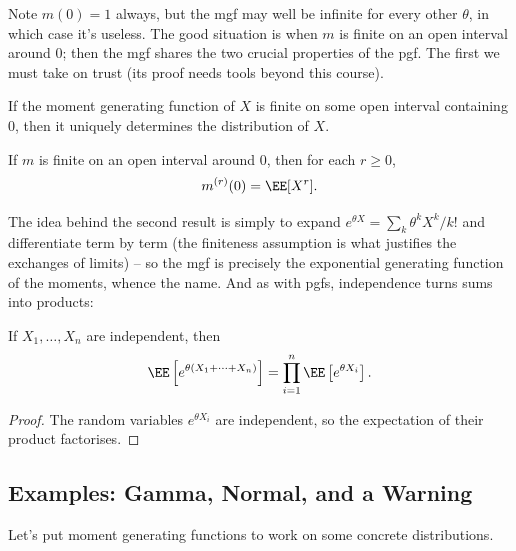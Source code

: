 Note $m(0) = 1$ always, but the mgf may well be infinite for every other $\theta$, in which case it's useless. The good situation is when $m$ is finite on an open interval around $0$; then the mgf shares the two crucial properties of the pgf. The first we must take on trust (its proof needs tools beyond this course).

\begin{theorem}[Uniqueness]
	If the moment generating function of $X$ is finite on some open interval containing $0$, then it uniquely determines the distribution of $X$.
\end{theorem}

\begin{theorem}
	If $m$ is finite on an open interval around $0$, then for each $r \geq 0$,
	$$
	m^{(r)}(0) = \EE[X^r].
	$$
\end{theorem}

The idea behind the second result is simply to expand $e^{\theta X} = \sum_k \theta^k X^k / k!$ and differentiate term by term (the finiteness assumption is what justifies the exchanges of limits) -- so the mgf is precisely the exponential generating function of the moments, whence the name. And as with pgfs, independence turns sums into products:

\begin{theorem}
	If $X_1, \dots, X_n$ are independent, then
	$$
	\EE\left[e^{\theta(X_1 + \cdots + X_n)}\right] = \prod_{i = 1}^{n} \EE\left[e^{\theta X_i}\right].
	$$
\end{theorem}
\begin{proof}
	The random variables $e^{\theta X_i}$ are independent, so the expectation of their product factorises.
\end{proof}

\subsection{Examples: Gamma, Normal, and a Warning}

Let's put moment generating functions to work on some concrete distributions.

